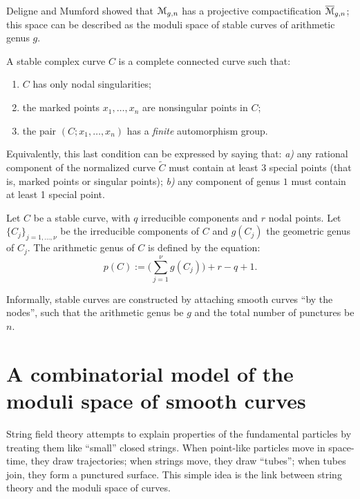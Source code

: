 Deligne and Mumford \cite{deligne-mumford} showed that $\mathcal{M}_{g,n}$ has
a projective compactification $\overline{\mathcal{M}}_{g,n}$; this space can be
described as the moduli space of stable curves of arithmetic genus
$g$.
\begin{definition}
  A stable complex curve $C$ is a complete connected curve such that:
  \begin{enumerate}
  \item $C$ has only nodal singularities;
  \item the marked points $x_1, \ldots, x_n$ are nonsingular points in
    $C$;
  \item the pair $(C; x_1, \ldots, x_n)$ has a \emph{finite} automorphism
    group.
  \end{enumerate}
\end{definition}
Equivalently, this last condition can be expressed by saying that:
\textsl{a)} any rational component of the normalized curve $\tilde C$
must contain at least 3 special points (that is, marked points or
singular points); \textsl{b)} any component of genus $1$ must contain
at least 1 special point.

Let $C$ be a stable curve, with $q$ irreducible components and $r$
nodal points. Let $\{C_j\}_{j=1, \dots, \nu}$ be the irreducible
components of $C$ and $g(C_j)$ the geometric genus of $C_j$.  The
arithmetic genus of $C$ is defined by the equation:
\begin{equation*}
  p(C) := \bigl({\textstyle \sum_{j=1}^\nu} g(C_j) \bigr) + r - q + 1.
\end{equation*}

Informally, stable curves are constructed by attaching smooth curves
``by the nodes'', such that the arithmetic genus be $g$ and the total
number of punctures be $n$.



\section{A combinatorial model of the moduli space of smooth curves}
\label{sec:mgn-comb}

String field theory attempts to explain properties of the fundamental
particles by treating them like ``small'' closed strings. When
point-like particles move in space-time, they draw trajectories; when
strings move, they draw ``tubes''; when tubes join, they form a
punctured surface. This simple idea is the link between string theory
and the moduli space of curves. 


